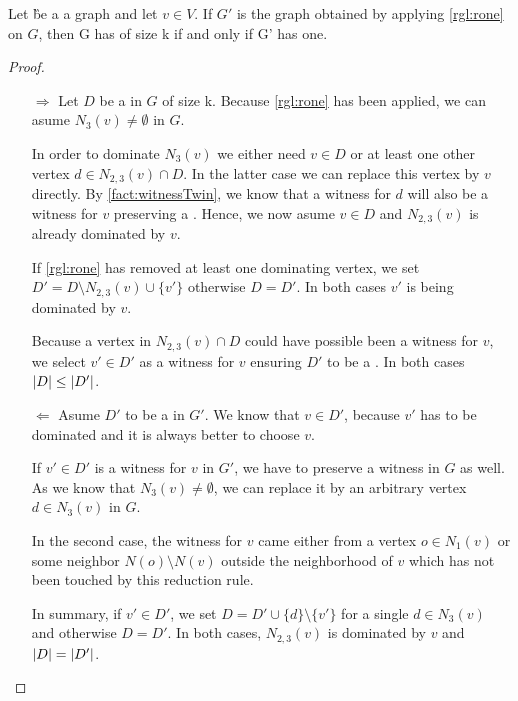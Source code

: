 \begin{lemma}\label{lemma:correctnessone}
    Let \G be a a graph and let $v \in V$. If $G'$ is the graph obtained by applying \cref{rgl:rone}   on $G$, then G has \sdom of size k if and only if G' has one.
\end{lemma}
\begin{proof}
    \begin{enumerate}
        \item[$\Rightarrow$] Let $D$ be a \sdom in $G$ of size k. 
        Because \cref{rgl:rone} has been applied, we can asume $N_3(v) \neq \emptyset$ in $G$. 
        
        In order to dominate $N_3(v)$ we either need $v \in D$ or at least one other vertex $d \in N_{2,3}(v) \cap D$. In the latter case we can replace this vertex by $v$ directly. By \cref{fact:witnessTwin}, we know that a witness for $d$ will also be a witness for $v$ preserving a \sdom. Hence, we now asume $v \in D$ and $N_{2,3}(v)$ is already dominated by $v$.

        If \cref{rgl:rone} has removed at least one dominating vertex, we set $D' = D \setminus N_{2,3}(v) \cup \{v'\}$ otherwise $D = D'$. In both cases $v'$ is being dominated by $v$.

        Because a vertex in $N_{2,3}(v) \cap D$ could have possible been a witness for $v$, we select $v' \in D'$ as a witness for $v$ ensuring $D'$ to be a \sdom. In both cases $\abs{D} \leq \abs{D'}$.

        \item[$\Leftarrow$]  Asume $D'$ to be a \sdom in $G'$. We know that $v \in D'$, because $v'$ has to be dominated and it is always better to choose $v$.

        If $v' \in D'$ is a witness for $v$ in $G'$, we have to preserve a witness in $G$ as well. As we know that $N_3(v) \neq \emptyset$, we can replace it by an arbitrary vertex $d \in N_3(v)$ in $G$. 
        
        In the second case, the witness for $v$ came either from a vertex $o \in N_1(v)$ or some neighbor $N(o) \setminus N(v)$ outside the neighborhood of $v$ which has not been touched by this reduction rule. 
        
        In summary, if $v' \in D'$, we set $D = D' \cup \{d\} \setminus \{v'\}$ for a single $d \in N_3(v)$ and otherwise $D = D'$. In both cases, $N_{2,3}(v)$ is dominated by $v$ and $\abs{D} = \abs{D'}$.


    \end{enumerate}

\end{proof}

